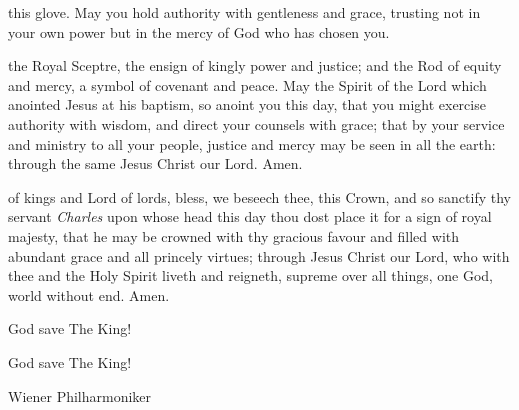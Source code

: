 { this glove. May you hold authority with gentleness and grace,
trusting not in your own power but in the mercy of God
who has chosen you.



\clearpage






 the Royal Sceptre, the ensign of kingly power and justice; and the
Rod of equity and mercy, a symbol of covenant and peace.
May the Spirit of the Lord which anointed Jesus at his baptism, so anoint
you this day, that you might exercise authority with wisdom, and direct
your counsels with grace; that by your service and ministry to all your
people, justice and mercy may be seen in all the earth: through the same
Jesus Christ our Lord. Amen.
\vfill 
{}



 of kings and Lord of lords,
bless, we beseech thee, this Crown,
and so sanctify thy servant \textit{Charles}
upon whose head this day thou dost place it
for a sign of royal majesty,
that he may be crowned with thy gracious favour
and filled with abundant grace and all princely virtues;
through Jesus Christ our Lord,
who with thee and the Holy Spirit liveth and reigneth,
supreme over all things,
one God, world without end.
Amen.




God save The King!


God save The King!

\vfill  {Wiener Philharmoniker}





}
